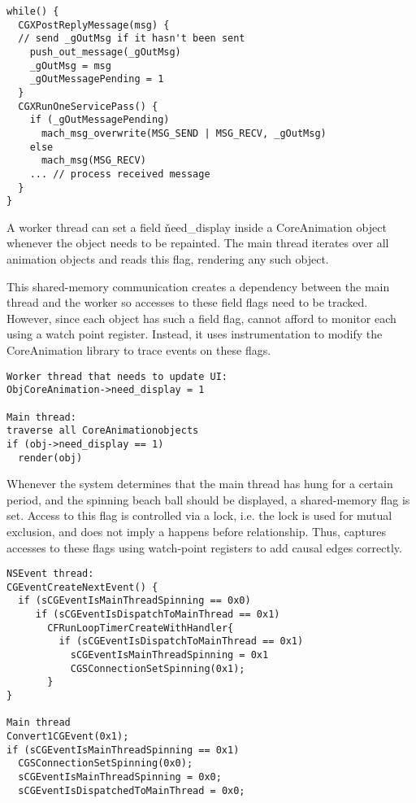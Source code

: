 {\footnotesize \begin{verbatim}
while() {
  CGXPostReplyMessage(msg) {
  // send _gOutMsg if it hasn't been sent
    push_out_message(_gOutMsg)
    _gOutMsg = msg
    _gOutMessagePending = 1
  }
  CGXRunOneServicePass() {
    if (_gOutMessagePending)
      mach_msg_overwrite(MSG_SEND | MSG_RECV, _gOutMsg)
    else
      mach_msg(MSG_RECV)
    ... // process received message
  }
}
\end{verbatim}
}

A worker thread can set a field \v{need\_display} inside a CoreAnimation object
whenever the object needs to be repainted. The main thread iterates over all
animation objects and reads this flag, rendering any such object.

This shared-memory communication creates a dependency between the main thread
and the worker so accesses to these field flags need to be tracked.  However,
since each object has such a field flag, \xxx cannot afford to monitor each
using a watch point register.  Instead, it uses instrumentation to modify the
CoreAnimation library to trace events on these flags.

{\footnotesize \begin{verbatim}
Worker thread that needs to update UI:
ObjCoreAnimation->need_display = 1

Main thread: 
traverse all CoreAnimationobjects
if (obj->need_display == 1)
  render(obj)

\end{verbatim}
}

Whenever the system determines that the main thread has hung for a certain
period, and the spinning beach ball should be displayed, a shared-memory flag
is set. Access to this flag is controlled via a lock, i.e. the lock is used for
mutual exclusion, and does not imply a happens before relationship.  Thus, \xxx
captures accesses to these flags using watch-point registers to add causal
edges correctly.

{\footnotesize \begin{verbatim}
NSEvent thread:
CGEventCreateNextEvent() {
  if (sCGEventIsMainThreadSpinning == 0x0)
     if (sCGEventIsDispatchToMainThread == 0x1)
       CFRunLoopTimerCreateWithHandler{
         if (sCGEventIsDispatchToMainThread == 0x1)
           sCGEventIsMainThreadSpinning = 0x1
           CGSConnectionSetSpinning(0x1);
       }
}

Main thread
Convert1CGEvent(0x1);
if (sCGEventIsMainThreadSpinning == 0x1)
  CGSConnectionSetSpinning(0x0);
  sCGEventIsMainThreadSpinning = 0x0;
  sCGEventIsDispatchedToMainThread = 0x0;
\end{verbatim}
}

